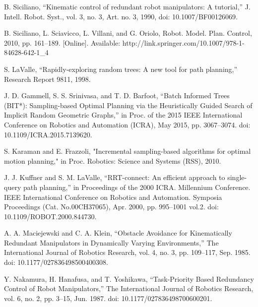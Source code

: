 \documentclass[letterpaper, 10 pt, conference]{ieeeconf}  %
\begin{document}
\begin{thebibliography}{99}
	
 B. Siciliano, “Kinematic control of redundant robot manipulators: A tutorial,” J. Intell. Robot. Syst., vol. 3, no. 3, Art. no. 3, 1990, doi: 10.1007/BF00126069.

 B. Siciliano, L. Sciavicco, L. Villani, and G. Oriolo, Robot. Model. Plan. Control, 2010, pp. 161–189. [Online]. Available: http://link.springer.com/10.1007/978-1-84628-642-1\_4


 S. LaValle, “Rapidly-exploring random trees: A new tool for path planning,” Research Report 9811, 1998.

 J. D. Gammell, S. S. Srinivasa, and T. D. Barfoot, “Batch Informed Trees (BIT*): Sampling-based Optimal Planning via the Heuristically Guided Search of Implicit Random Geometric Graphs,” in Proc. of the 2015 IEEE International Conference on Robotics and Automation (ICRA), May 2015, pp. 3067–3074. doi: 10.1109/ICRA.2015.7139620.

 S. Karaman and E. Frazzoli, "Incremental sampling-based algorithms for optimal motion planning," in Proc. Robotics: Science and Systems (RSS), 2010.

 J. J. Kuffner and S. M. LaValle, “RRT-connect: An efficient approach to single-query path planning,” in Proceedings of the 2000 ICRA. Millennium Conference. IEEE International Conference on Robotics and Automation. Symposia Proceedings (Cat. No.00CH37065), Apr. 2000, pp. 995–1001 vol.2. doi: 10.1109/ROBOT.2000.844730.

 A. A. Maciejewski and C. A. Klein, “Obstacle Avoidance for Kinematically Redundant Manipulators in Dynamically Varying Environments,” The International Journal of Robotics Research, vol. 4, no. 3, pp. 109–117, Sep. 1985. doi: 10.1177/027836498500400308.

 Y. Nakamura, H. Hanafusa, and T. Yoshikawa, “Task-Priority Based Redundancy Control of Robot Manipulators,” The International Journal of Robotics Research, vol. 6, no. 2, pp. 3–15, Jun. 1987. doi: 10.1177/027836498700600201.


\end{thebibliography}
\end{document}
